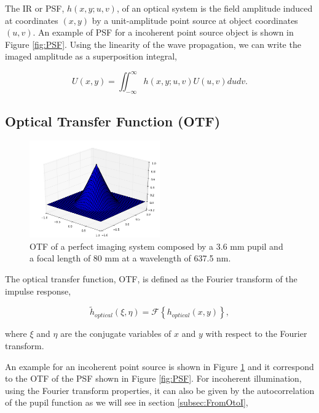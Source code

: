 The IR or PSF, $h(x,y;u,v)$, of an optical system is  the field amplitude induced at coordinates $(x,y)$ by a unit-amplitude point source at object coordinates $(u,v)$. An example of PSF for a incoherent point source object is shown in Figure \ref{fig:PSF}. Using the linearity of the wave propagation, we can write the imaged amplitude as a superposition integral,

\begin{equation}
U(x,y) = \iint_{-\infty}^{\infty} h(x,y;u,v)U(u,v)dudv.
\label{eqt:superpositionIntegral}
\end{equation}

\subsection{Optical Transfer Function (OTF)}
\label{subsec:OTF}

\begin{figure}
\begin{center}
\includegraphics[width=0.5\textwidth,angle=0]{Figures/OTF.png}
\decoRule
\caption{OTF of a perfect imaging system composed by a 3.6 mm pupil and a focal length of 80 mm at a wavelength of 637.5 nm.}
\label{fig:OTF}
\end{center}
\end{figure}

The optical transfer function, OTF, is defined as the Fourier transform of the impulse response,

\begin{equation}
\widetilde{h}_{optical}(\xi,\eta) = \mathcal{F}\left\lbrace h_{optical}(x,y)\right\rbrace ,
\label{eqt:OTF}
\end{equation}

where $\xi$ and $\eta$ are the conjugate variables of $x$ and $y$ with respect to the Fourier transform.

An example for an incoherent point source is shown in Figure \ref{fig:OTF} and it correspond to the OTF of the PSF shown in Figure \ref{fig:PSF}. For incoherent illumination, using the Fourier transform properties, it can also be given by the autocorrelation of the pupil function as we will see in section \ref{subsec:FromOtoI},

